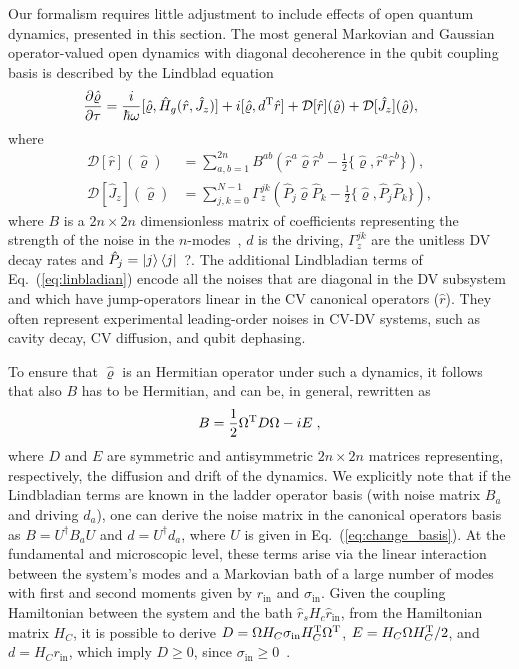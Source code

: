 \documentclass[%
reprint,
superscriptaddress,
nofootinbib,
 amsmath,amssymb,
prx,
floatfix,
]{revtex4-2}
\begin{document}
Our formalism requires little adjustment to include effects of open quantum dynamics, presented in this section. The most general Markovian and Gaussian operator-valued open dynamics with diagonal decoherence in the qubit coupling basis is described by the Lindblad equation  
\begin{align}\label{eq:linbladian}
    \hspace{-0.1cm} \frac{\partial \hat{\varrho}}{\partial \tau} &=  \frac{i}{\hbar \omega} [ \hat{\varrho}, \hat{H}_g (\hat{r}, \hat{J}_z)] +  i [ \hat{\varrho}, d^{\rm T} \hat{r}]   + \mathcal{D}[\hat{r}] (\hat{\varrho})  + \mathcal{D}[\hat{J}_z] (\hat{\varrho}) ,
\end{align}
where 
\begin{align}
    \mathcal{D}[\hat{r}] (\hat{\varrho})  &= \sum_{a, b = 1}^{2 n}  B^{a b} \left(  \hat{r}^a \hat{\varrho} \hat{r}^b  - \frac{1}{2} \{ \hat{\varrho}, \hat{r}^a  \hat{r}^b \} \right), \label{lindo}  \\
    \mathcal{D}[\hat{J}_z] (\hat{\varrho}) &= \sum_{j, k  = 0}^{N-1} \Gamma_z^{jk} \left(\hat{P}_{j} \hat{\varrho} \hat{P}_{k}   - \frac{1}{2} \{ \hat{\varrho}, \hat{P}_{j} \hat{P}_{k} \}  \right),\label{linda} 
\end{align}
where $B$ is a $2n \times 2n$ dimensionless matrix of coefficients representing the strength of the noise in the $n$-modes~\cite{serafini_quantum_2017}, $d$ is the driving, $\Gamma_z^{jk}$ are the unitless DV decay rates and $\hat{P}_{j} = \ket{j}\bra{j}$~\cite{PhysRevLett.114.010501}?. The additional Lindbladian terms of Eq.~(\ref{eq:linbladian}) encode all the noises that are diagonal in the DV subsystem and which have jump-operators linear in the CV canonical operators ($\hat{r}$). They often represent experimental leading-order noises in CV-DV systems, such as cavity decay, CV diffusion, and qubit dephasing. 

To ensure that $\hat{\varrho}$ is an Hermitian operator under such a dynamics, it follows that also $B$ has to be Hermitian, and can be, in general, rewritten as 
\begin{equation}
    B = \frac{1}{2} \Omega^{\rm T} D \Omega - i  E \; ,
\end{equation}
where $D$ and $E$ are symmetric and antisymmetric $2n \times 2n$ matrices representing, respectively, the diffusion and drift of the dynamics. We explicitly note that if the Lindbladian terms are known in the ladder operator basis (with noise matrix $B_a$ and driving $d_a$), one can derive the noise matrix in the canonical operators basis as $B = U^{\dag} B_a U$ and $d = U^{\dag} d_a$, where $U$ is given in Eq.~(\ref{eq:change_basis}).  At the fundamental and microscopic level, these terms arise via the linear interaction between the system's modes and a Markovian bath of a large number of modes with first and second moments given by $r_{\text{in}}$ and $\sigma_{\text{in}}$. Given the coupling Hamiltonian between the system and the bath $\hat{r}_s H_c \hat{r}_{\text{in}}$, from the Hamiltonian matrix $H_C$, it is possible to derive $D = \Omega H_C \sigma_{\text{in}} H_C^{\rm T} \Omega^{\rm T}$, $E =H_C \Omega H_C^{\rm T}/2$, and $d = H_C r_{\text{in}}$, which imply $D \geq 0$, since $\sigma_{\text{in}} \geq 0$~\cite{serafini_quantum_2017}. 
\end{document}
